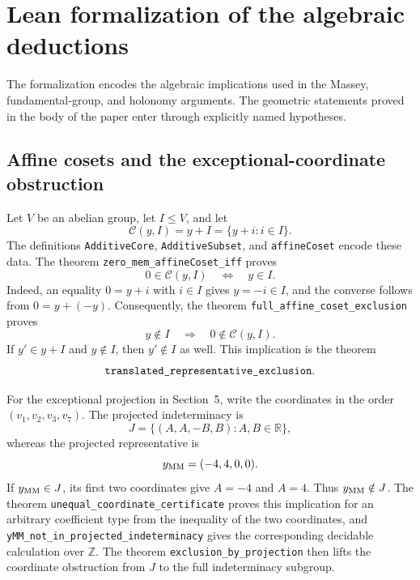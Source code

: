 \documentclass[11pt]{article}
\theoremstyle{remark}\newtheorem{remark}[theorem]{Remark}
\newcommand{\R}{\mathbb R}
\newcommand{\Z}{\mathbb Z}
\begin{document}
\appendix
\section{Lean formalization of the algebraic deductions}\label{app:lean}

The formalization encodes the algebraic implications used in the Massey,
fundamental-group, and holonomy arguments.  The geometric statements proved
in the body of the paper enter through explicitly named hypotheses.

\subsection{Affine cosets and the exceptional-coordinate obstruction}

Let $V$ be an abelian group, let $I\leq V$, and let
\[
 \mathcal C(y,I)=y+I=\{y+i:i\in I\}.
\]
The definitions \texttt{AdditiveCore}, \texttt{AdditiveSubset}, and
\texttt{affineCoset} encode these data.  The theorem
\texttt{zero\_mem\_affineCoset\_iff} proves
\begin{equation}\label{eq:lean-coset}
 0\in\mathcal C(y,I)\quad\Longleftrightarrow\quad y\in I.
\end{equation}
Indeed, an equality $0=y+i$ with $i\in I$ gives $y=-i\in I$, and the
converse follows from $0=y+(-y)$.  Consequently, the theorem
\texttt{full\_affine\_coset\_exclusion} proves
\[
 y\notin I\quad\Longrightarrow\quad 0\notin\mathcal C(y,I).
\]
If $y'\in y+I$ and $y\notin I$, then $y'\notin I$ as well.  This implication
is the theorem
\[
 \text{\texttt{translated\_representative\_exclusion}}.
\]

For the exceptional projection in Section~5, write the coordinates in the
order $(v_1,v_2,v_3,v_7)$.  The projected indeterminacy is
\begin{equation}\label{eq:lean-coordinate-subspace}
 J=\{(A,A,-B,B):A,B\in\R\},
\end{equation}
whereas the projected representative is
\[
 y_{\rm MM}=(-4,4,0,0).
\]
If $y_{\rm MM}\in J$, its first two coordinates give $A=-4$ and $A=4$.
Thus $y_{\rm MM}\notin J$.  The theorem
\texttt{unequal\_coordinate\_certificate} proves this implication for an
arbitrary coefficient type from the inequality of the two coordinates,
and \texttt{yMM\_not\_in\_projected\_indeterminacy} gives the corresponding
decidable calculation over $\Z$.  The theorem
\texttt{exclusion\_by\_projection} then lifts the coordinate obstruction
from $J$ to the full indeterminacy subgroup.
\end{document}
